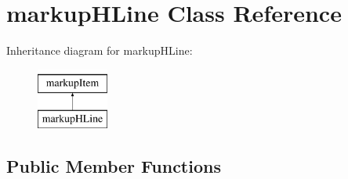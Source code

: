 \hypertarget{classmarkupHLine}{
\section{markupHLine Class Reference}
\label{classmarkupHLine}
}
Inheritance diagram for markupHLine:\begin{figure}[H]
\begin{center}
\leavevmode
\includegraphics[height=2.000000cm]{classmarkupHLine}
\end{center}
\end{figure}
\subsection*{Public Member Functions}
